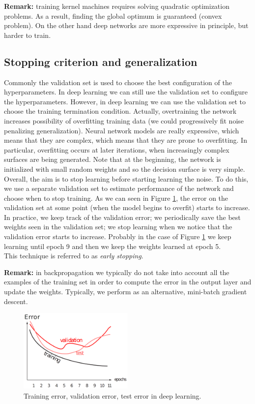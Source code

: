 \textbf{Remark:} training kernel machines requires solving quadratic optimization
problems. As a result, finding the global optimum is guaranteed (convex problem).
On the other hand deep networks are more expressive in principle, but harder to train.

\subsection{Stopping criterion and generalization}
Commonly the validation set is used to choose the best configuration of the hyperparameters.
In deep learning we can still use the validation set to configure the
hyperparameters. However, in deep learning we can use the validation set to
choose the training termination condition. Actually, overtraining the network
increases possibility of overfitting training data (we could progressively fit noise
penalizing generalization). Neural network models are really expressive, which
means that they are complex, which means that they are prone to overfitting. In
particular, overfitting occurs at later iterations, when increasingly complex
surfaces are being generated. Note that at the beginning, the network is
initialized with small random weights and so the decision surface is very simple.
Overall, the aim is to stop learning before starting learning the noise. To do this,
we use a separate validation set to estimate performance of the network and
choose when to stop training. As we can seen in Figure \ref{fig:deep_training_test_valudation},
the error on the validation set at some point (when the model begins to overfit)
starts to increase. In practice, we keep track of the validation error; we periodically
save the best weights seen in the validation set; we stop learning when we
notice that the validation error starts to increase. Probably in the case of Figure
\ref{fig:deep_training_test_valudation} we keep learning until epoch 9 and then we
keep the weights learned at epoch 5.\\ This technique is referred to as \textit{early
stopping}.
\newline

\textbf{Remark:} in backpropagation we typically do not take into account all
the examples of the training set in order to compute the error in the output
layer and update the weights. Typically, we perform as an alternative, mini-batch
gradient descent.

\begin{figure}[H]
	\centering
	\includegraphics[width=0.5\textwidth]{
		images/16_DeepLearning_stoppingCriterion.png
	}
	\caption{Training error, validation error, test error in deep learning.}
	\label{fig:deep_training_test_valudation}
\end{figure}

